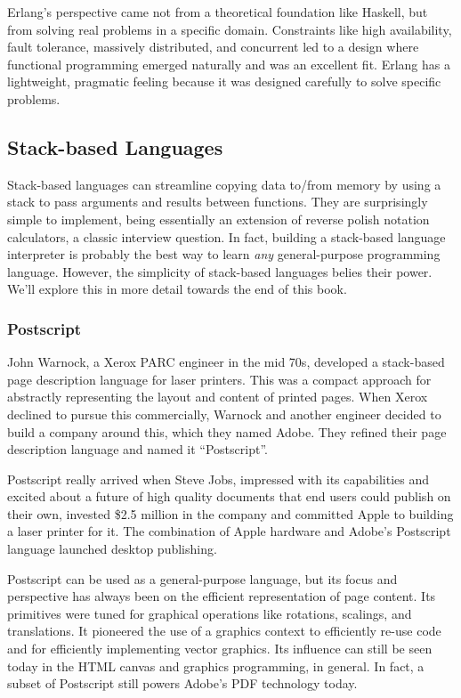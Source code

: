 Erlang's perspective came not from a theoretical foundation like Haskell, but
from solving real problems in a specific domain. Constraints like high
availability, fault tolerance, massively distributed, and concurrent led to a
design where functional programming emerged naturally and was an excellent fit.
Erlang has a lightweight, pragmatic feeling because it was designed carefully
to solve specific problems.

\subsection{Stack-based Languages}

Stack-based languages can streamline copying data to/from memory by using a
stack to pass arguments and results between functions. They are surprisingly
simple to implement, being essentially an extension of reverse polish notation
calculators, a classic interview question. In fact, building a stack-based
language interpreter is probably the best way to learn \textit{any}
general-purpose programming language. However, the simplicity of stack-based
languages belies their power. We'll explore this in more detail towards the end
of this book.

\subsubsection{Postscript}

John Warnock, a Xerox PARC engineer in the mid 70s, developed a stack-based
page description language for laser printers. This was a compact approach for
abstractly representing the layout and content of printed pages. When Xerox
declined to pursue this commercially, Warnock and another engineer decided to
build a company around this, which they named Adobe. They refined their page
description language and named it ``Postscript''.

Postscript really arrived when Steve Jobs, impressed with its capabilities and
excited about a future of high quality documents that end users could publish
on their own, invested \$2.5 million in the company and committed Apple to
building a laser printer for it. The combination of Apple hardware and Adobe's
Postscript language launched desktop publishing.

Postscript can be used as a general-purpose language, but its focus and
perspective has always been on the efficient representation of page content.
Its primitives were tuned for graphical operations like rotations, scalings,
and translations. It pioneered the use of a graphics context to efficiently
re-use code and for efficiently implementing vector graphics. Its influence can
still be seen today in the HTML canvas and graphics programming, in general. In
fact, a subset of Postscript still powers Adobe's PDF technology today.

